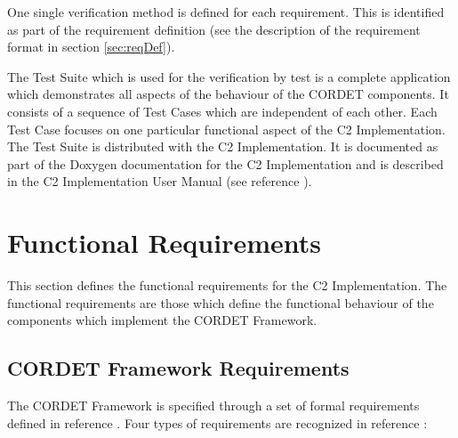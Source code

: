 \documentclass[a4paper,10pt]{article}
\let\stdsection\section
\renewcommand\section{\newpage\stdsection}
\begin{document}
One single verification method is defined for each requirement. 
This is identified as part of the requirement definition (see the description of the requirement format in section \ref{sec:reqDef}).

The Test Suite which is used for the verification by test is a complete application which demonstrates all aspects of the behaviour of the CORDET components. It consists of a sequence of Test Cases which are independent of each other. Each Test Case focuses on one particular functional aspect of the C2 Implementation. The Test Suite is distributed with the C2 Implementation. It is documented as part of the Doxygen documentation for the C2 Implementation and is described in the C2 Implementation User Manual (see reference \cite{ref:C2Implementation}).


\let\stdsubsection\subsection
\renewcommand\subsection{\newpage\stdsubsection}


\section{Functional Requirements}\label{sec:fncReqs}
This section defines the functional requirements for the C2 Implementation. The functional requirements are those which define the functional behaviour of the components which implement the CORDET Framework.

\stdsubsection{CORDET Framework Requirements}\label{req:ImplCrReq}

The CORDET Framework is specified through a set of formal requirements defined in reference \cite{ref:cordetfw}. Four types of requirements are recognized in reference \cite{ref:cordetfw}: 
\end{document}
